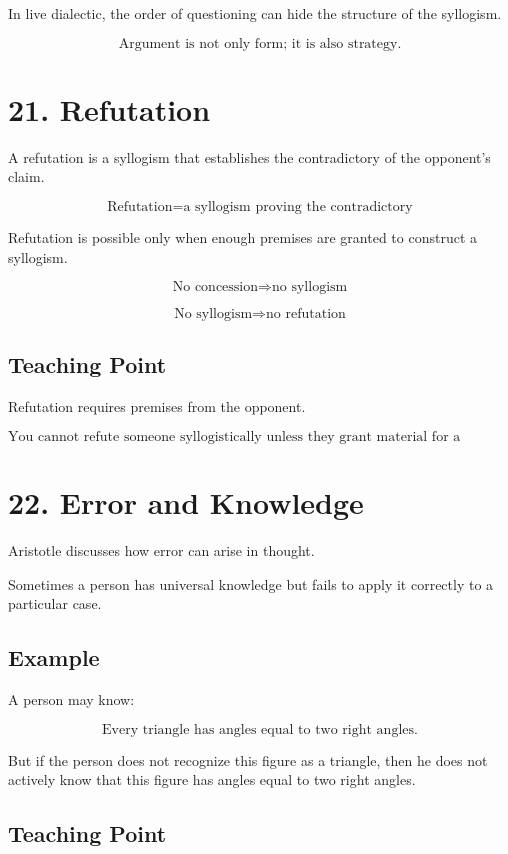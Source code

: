 \documentclass[12pt]{article}
\begin{document}
In live dialectic, the order of questioning can hide the structure of the
syllogism.

\[
\boxed{
\text{Argument is not only form; it is also strategy.}
}
\]

\section*{21. Refutation}

A refutation is a syllogism that establishes the contradictory of the opponent's
claim.

\[
\boxed{
\text{Refutation} = \text{a syllogism proving the contradictory}
}
\]

Refutation is possible only when enough premises are granted to construct a
syllogism.

\[
\text{No concession} \Rightarrow \text{no syllogism}
\]

\[
\text{No syllogism} \Rightarrow \text{no refutation}
\]

\subsection*{Teaching Point}

Refutation requires premises from the opponent.

\[
\boxed{
\text{You cannot refute someone syllogistically unless they grant material for a syllogism.}
}
\]

\section*{22. Error and Knowledge}

Aristotle discusses how error can arise in thought.

Sometimes a person has universal knowledge but fails to apply it correctly to a
particular case.

\subsection*{Example}

A person may know:

\[
\text{Every triangle has angles equal to two right angles.}
\]

But if the person does not recognize this figure as a triangle, then he does
not actively know that this figure has angles equal to two right angles.

\subsection*{Teaching Point}
\end{document}
